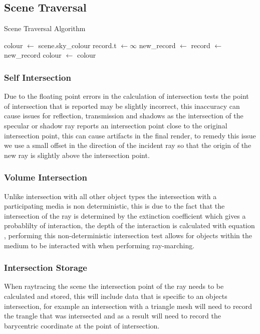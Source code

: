 \subsection{Scene Traversal}


\begin{algorithm}
\begin{algorithmic}
\caption{Scene Traversal Algorithm}
\State colour   $\gets$ scene.sky\_colour
\State record.t $\gets \infty$
	\State new\_record $\gets$ 
	\State record $\gets$ new\_record
	\EndIf
\EndFor
{}
	\State colour $\gets$ 
\EndIf
\State \Return colour
\end{algorithmic}
\end{algorithm}

\subsubsection{Self Intersection}
Due to the floating point errors in the calculation of intersection tests the point of intersection that is reported may be
slightly incorrect, this inaccuracy can cause issues for reflection, transmission and shadows as the intersection of the
specular or shadow ray reports an intersection point close to the original intersection point, this can cause artifacts in
the final render, to remedy this issue we use a small offset in the direction of the incident ray so that the origin of the
new ray is slightly above the intersection point.

\subsubsection{Volume Intersection}
Unlike intersection with all other object types the intersection with a participating media is non deterministic, this is
due to the fact that the intersection of the ray is determined by the extinction coefficient which gives a probablilty
of interaction, the depth of the interaction is calculated with equation , performing this non-deterministic
intersection test allows for objects within the medium to be interacted with when performing ray-marching.


\subsubsection{Intersection Storage}
When raytracing the scene the intersection point of the ray needs to be calculated and stored, this will include data that
is specific to an objects intersection, for example an intersection with a triangle mesh will need to record the trangle
that was intersected and as a result will need to record the barycentric coordinate at the point of intersection.


\newpage

\newpage

